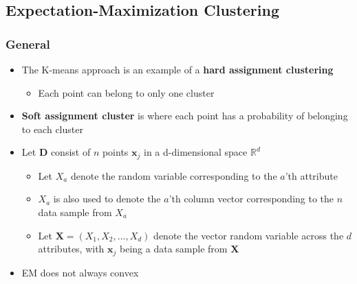 \documentclass[11pt]{article}
\begin{document}
\subsection{Expectation-Maximization Clustering}
\label{sec:orgd360994}
\subsubsection{General}
\label{sec:orga8c046e}
\begin{itemize}
\item The K-means approach is an example of a \textbf{hard assignment clustering}
\begin{itemize}
\item Each point can belong to only one cluster
\end{itemize}

\item \textbf{Soft assignment cluster} is where each point has a probability of belonging to each cluster

\item Let \(\mathbf D\) consist of \(n\) points \(\pmb x_j\) in a d-dimensional space \(\mathbb R^d\)
\begin{itemize}
\item Let \(X_a\) denote the random variable corresponding to the \(a\)'th attribute
\item \(X_a\) is also used to denote the \(a\)'th column vector corresponding to the \(n\) data sample from \(X_a\)
\item Let \(\mathbf X = (X_1, X_2, \dots, X_d)\) denote the vector random variable across the \(d\) attributes, with \(\pmb x_j\) being a data sample from \(\mathbf X\)
\end{itemize}

\item EM does not always convex
\end{itemize}
\end{document}
